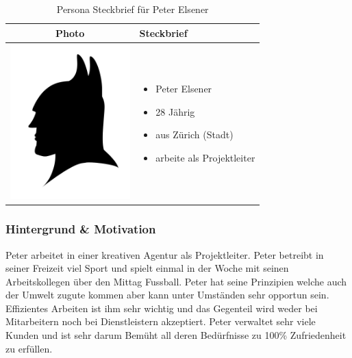 \begin{table}[h!]
  \centering
  \begin{tabular}{ | c | m{5cm} | }
    \hline
    Photo & Steckbrief \\ \hline
    \begin{minipage}{.3\textwidth}
      \includegraphics[width=\linewidth, height=60mm]{images/batman.jpg}
    \end{minipage}
    &
      \begin{itemize}
        \item Peter Elsener
        \item 28 Jährig
        \item aus Zürich (Stadt)
        \item arbeite als Projektleiter
      \end{itemize}
    \\ \hline
  \end{tabular}
  \caption{Persona Steckbrief für Peter Elsener}\label{tbl:steckbriefpeter}
\end{table}

\subsubsection{Hintergrund \& Motivation}
Peter arbeitet in einer kreativen Agentur als Projektleiter. Peter betreibt in seiner Freizeit viel Sport und spielt einmal in der Woche mit seinen Arbeitskollegen über den Mittag Fussball. Peter hat seine Prinzipien welche auch der Umwelt zugute kommen aber kann unter Umständen sehr opportun sein. Effizientes Arbeiten ist ihm sehr wichtig und das Gegenteil wird weder bei Mitarbeitern noch bei Dienstleistern akzeptiert. Peter verwaltet sehr viele Kunden und ist sehr darum Bemüht all deren Bedürfnisse zu 100\% Zufriedenheit zu erfüllen.

